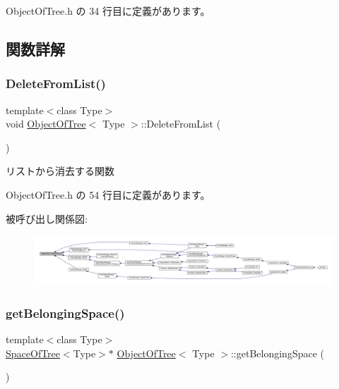  Object\+Of\+Tree.\+h の 34 行目に定義があります。



\subsection{関数詳解}
\mbox{\label{class_object_of_tree_a1356595b29749ca4555ca61a5bb30388}} 
\subsubsection{\texorpdfstring{Delete\+From\+List()}{DeleteFromList()}}
{\footnotesize\ttfamily template$<$class Type$>$ \\
void \mbox{\hyperlink{class_object_of_tree}{Object\+Of\+Tree}}$<$ Type $>$\+::Delete\+From\+List (\begin{DoxyParamCaption}{ }\end{DoxyParamCaption})\hspace{0.3cm}{\ttfamily [inline]}}



リストから消去する関数 



 Object\+Of\+Tree.\+h の 54 行目に定義があります。

被呼び出し関係図\+:
\nopagebreak
\begin{figure}[H]
\begin{center}
\leavevmode
\includegraphics[width=350pt]{class_object_of_tree_a1356595b29749ca4555ca61a5bb30388_icgraph}
\end{center}
\end{figure}
\mbox{\label{class_object_of_tree_a94c5724ddb841da0bb31ab6ae63df304}} 
\subsubsection{\texorpdfstring{get\+Belonging\+Space()}{getBelongingSpace()}}
{\footnotesize\ttfamily template$<$class Type$>$ \\
\mbox{\hyperlink{class_space_of_tree}{Space\+Of\+Tree}}$<$Type$>$$\ast$ \mbox{\hyperlink{class_object_of_tree}{Object\+Of\+Tree}}$<$ Type $>$\+::get\+Belonging\+Space (\begin{DoxyParamCaption}{ }\end{DoxyParamCaption})\hspace{0.3cm}{\ttfamily [inline]}}




